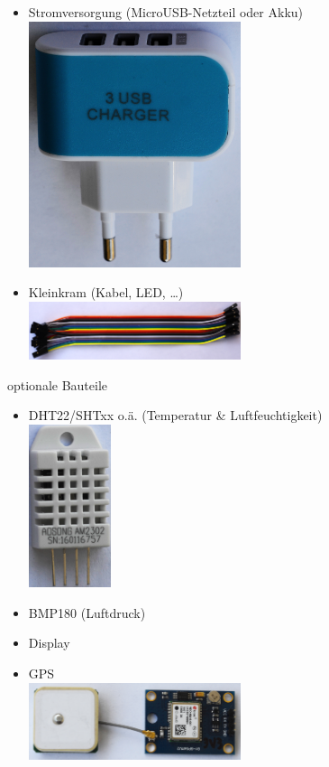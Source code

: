 \documentclass[
notumble,
]{leaflet}
\begin{document}
\begin{itemize}
\item Stromversorgung (MicroUSB-Netzteil oder Akku) \\\includegraphics[width=0.49\textwidth]{images/sensor/usbcharger.jpg}
\item Kleinkram (Kabel, LED, \dots) \\\includegraphics[width=0.49\textwidth]{images/sensor/cable_dupont.jpg}
\end{itemize}

optionale Bauteile

\begin{itemize}
\item DHT22/SHTxx o.ä. (Temperatur \& Luftfeuchtigkeit)\\\includegraphics[width=0.19\textwidth,angle=90]{images/sensor/dht22.jpg}
\item BMP180 (Luftdruck) %
\item Display
\item GPS \\\includegraphics[width=0.49\textwidth]{images/sensor/gps.jpg}
\end{itemize}
\end{document}
